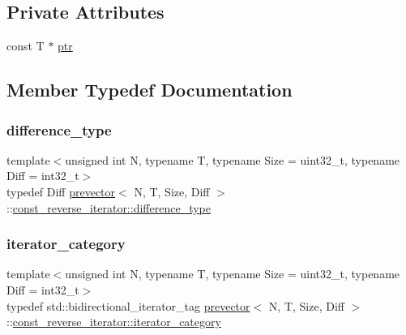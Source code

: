 \subsection*{Private Attributes}
\begin{DoxyCompactItemize}
\item 
const T $\ast$ \mbox{\hyperlink{classprevector_1_1const__reverse__iterator_ae4d030a4b5660ed08dcd20a2f5df1d22}{ptr}}
\end{DoxyCompactItemize}


\subsection{Member Typedef Documentation}
\mbox{\label{classprevector_1_1const__reverse__iterator_a9dbda696cb2dcbe5ea56dcbdd47976d9}} 
\subsubsection{\texorpdfstring{difference\+\_\+type}{difference\_type}}
{\footnotesize\ttfamily template$<$unsigned int N, typename T, typename Size = uint32\+\_\+t, typename Diff = int32\+\_\+t$>$ \\
typedef Diff \mbox{\hyperlink{classprevector}{prevector}}$<$ N, T, Size, Diff $>$\+::\mbox{\hyperlink{classprevector_1_1const__reverse__iterator_a9dbda696cb2dcbe5ea56dcbdd47976d9}{const\+\_\+reverse\+\_\+iterator\+::difference\+\_\+type}}}

\mbox{\label{classprevector_1_1const__reverse__iterator_a95e256c2f41ed8b914677594e6f22352}} 
\subsubsection{\texorpdfstring{iterator\+\_\+category}{iterator\_category}}
{\footnotesize\ttfamily template$<$unsigned int N, typename T, typename Size = uint32\+\_\+t, typename Diff = int32\+\_\+t$>$ \\
typedef std\+::bidirectional\+\_\+iterator\+\_\+tag \mbox{\hyperlink{classprevector}{prevector}}$<$ N, T, Size, Diff $>$\+::\mbox{\hyperlink{classprevector_1_1const__reverse__iterator_a95e256c2f41ed8b914677594e6f22352}{const\+\_\+reverse\+\_\+iterator\+::iterator\+\_\+category}}}

